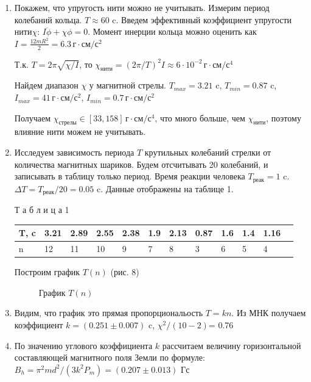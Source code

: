 \documentclass[a4paper, 12pt]{article}
\begin{document}
\begin{enumerate}
\item Покажем, что упругость нити можно не учитывать. Измерим период колебаний кольца. $T \approx 60$ c. Введем эффективный коэффициент упругости нити$\chi$: $I \ddot{\phi} + \chi \phi = 0$. Момент инерции кольца можно оценить как $I=\frac{12 m R^{2}}{2}=6.3 \,\text{г} \cdot \text{см}/\text{с}^2$ 

Т.к. $T = 2\pi \sqrt{\chi/I}$, то $\chi_{\text{нити}} = (2 \pi /T)^2 I \approx 6 \cdot 10^{-2}  \, \text{г}\cdot \text{см}/\text{с}^4$ 

Найдем диапазон $\chi$ у магнитной стрелы. $T_{max} = 3.21$ c, $T_{min} = 0.87$ c, $I_{max} = 41 \,\text{г} \cdot \text{см}/\text{с}^2$,  $I_{min} = 0.7 \,\text{г} \cdot \text{см}/\text{с}^2$

Получаем $\chi_{\text{стрелы}} \in [33, 158] \, \text{г}\cdot \text{см}/\text{с}^4$, что много больше, чем $\chi_{\text{нити}}$, поэтому влияние нити можем не учитывать.

\item
Исследуем зависимость периода $T$ крутильных колебаний стрелки от количества магнитных шариков. Будем отсчитывать 20 колебаний, и записывать в таблицу только период. Время реакции человека $T_{\text{реак}} = 1$ c. $\Delta T = T_{\text{реак}}/20 = 0.05$ c. Данные отображены на таблице 1.


Т а б л и ц а 1
\newline

\begin{tabular}{|l|l|l|l|l|l|l|l|l|l|l|l|}
\hline

T, c & 3.21 & 2.89 & 2.55 & 2.38 & 1.9 & 2.13 & 0.87 & 1.6 & 1.4 & 1.16 \\ \hline
n & 12  & 11 & 10& 9 & 7 & 8 & 3 & 6 & 5 & 4 \\ \hline

\end{tabular}

Построим график $T(n)$ (рис. 8) 
\begin{figure}[h]
\caption{График $T(n)$}
\label{ris:image}
\end{figure}
\item
Видим, что график это прямая пропорциональость $T=kn$.
Из МНК получаем коэффициент  $k = (0.251\pm0.007)$ c,  $\chi^2/(10-2) $= 0.76
\item
По значению углового коэффициента $k$ рассчитаем величину горизонтальной составляющей магнитного поля Земли по формуле: $B_{h}=\pi^{2} m d^{2} / (3 k^{2} P_{m}) = (0.207\pm0.013)$ Гс



\end{enumerate}
\end{document}
